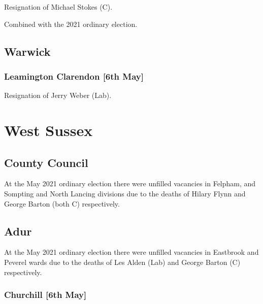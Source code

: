 \documentclass[a4paper,openany]{book}
\begin{document}
\begin{resultsiii}

Resignation of Michael Stokes (C).

Combined with the 2021 ordinary election.

\subsection*{Warwick}

\subsubsection*{Leamington Clarendon \hspace*{\fill}\nolinebreak[1]%
	\enspace\hspace*{\fill}
	[6th May]}


Resignation of Jerry Weber (Lab).

\section{West Sussex}

\subsection*{County Council}

At the May 2021 ordinary election there were unfilled vacancies in Felpham, and Sompting and North Lancing divisions due to the deaths of Hilary Flynn and George Barton (both C) respectively.

\subsection*{Adur}

At the May 2021 ordinary election there were unfilled vacancies in Eastbrook and Peverel wards due to the deaths of Les Alden (Lab) and George Barton (C) respectively.

\subsubsection*{Churchill \hspace*{\fill}\nolinebreak[1]%
	\enspace\hspace*{\fill}
	[6th May]}


\end{resultsiii}
\end{document}
